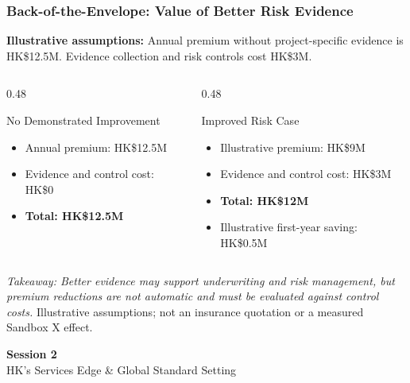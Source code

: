 \documentclass{beamer}
\begin{document}
\begin{frame}[t,shrink=11]
\frametitle{Back-of-the-Envelope: Value of Better Risk Evidence}
\textbf{Illustrative assumptions:} Annual premium without project-specific evidence is HK\$12.5M. Evidence collection and risk controls cost HK\$3M.
\begin{columns}[T]
\begin{column}{0.48\textwidth}\begin{block}{No Demonstrated Improvement}
\begin{itemize}
\item Annual premium: HK\$12.5M
\item Evidence and control cost: HK\$0
\item \textbf{Total: HK\$12.5M}
\end{itemize}\end{block}\end{column}
\begin{column}{0.48\textwidth}\begin{block}{Improved Risk Case}
\begin{itemize}
\item Illustrative premium: HK\$9M
\item Evidence and control cost: HK\$3M
\item \textbf{Total: HK\$12M}
\item Illustrative first-year saving: HK\$0.5M
\end{itemize}\end{block}\end{column}
\end{columns}
\textit{Takeaway: Better evidence may support underwriting and risk management, but premium reductions are not automatic and must be evaluated against control costs.}
\vfill{\tiny Illustrative assumptions; not an insurance quotation or a measured Sandbox X effect.}
\end{frame}

\begin{frame}[c]
  \begin{center}
    \huge\color{cuhkpurple}\textbf{Session 2}\\
    \vspace{0.5cm}
    \Large HK's Services Edge \& Global Standard Setting
  \end{center}
\end{frame}
\end{document}

